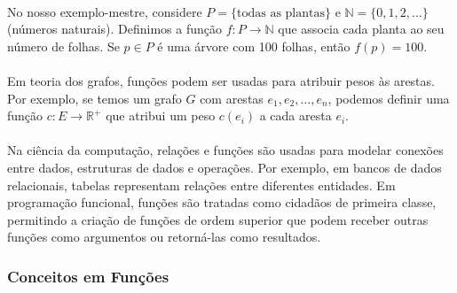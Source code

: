 \documentclass[12pt,a4paper]{article}
\begin{document}
\paragraph{}
No nosso exemplo-mestre, considere \(P=\{\text{todas as plantas}\}\) e \(\mathbb{N}=\{0,1,2,\ldots\}\) (números naturais). Definimos a função \(f: P \to \mathbb{N}\) que associa cada planta ao seu número de folhas. Se \(p \in P\) é uma árvore com 100 folhas, então \(f(p) = 100\).

\paragraph{}
Em teoria dos grafos, funções podem ser usadas para atribuir pesos às arestas. Por exemplo, se temos um grafo \(G\) com arestas \(e_1, e_2, \ldots, e_n\), podemos definir uma função \(c: E \to \mathbb{R}^+\) que atribui um peso \(c(e_i)\) a cada aresta \(e_i\).

\paragraph{}
Na ciência da computação, relações e funções são usadas para modelar conexões entre dados, estruturas de dados e operações. Por exemplo, em bancos de dados relacionais, tabelas representam relações entre diferentes entidades. Em programação funcional, funções são tratadas como cidadãos de primeira classe, permitindo a criação de funções de ordem superior que podem receber outras funções como argumentos ou retorná-las como resultados.

\subsubsection{Conceitos em Funções}
\end{document}

